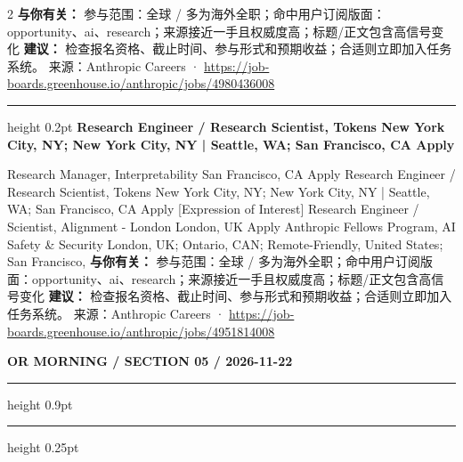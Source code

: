 \documentclass[10.5pt]{ctexart}
\begin{document}
\begin{multicols}{2}
\textbf{与你有关：} 参与范围：全球 / 多为海外全职；命中用户订阅版面：opportunity、ai、research；来源接近一手且权威度高；标题/正文包含高信号变化
\textbf{建议：} 检查报名资格、截止时间、参与形式和预期收益；合适则立即加入任务系统。
{\footnotesize\color{ormuted} 来源：Anthropic Careers · \url{https://job-boards.greenhouse.io/anthropic/jobs/4980436008}}
\vspace{2mm}
\hrule height 0.2pt
\vspace{2mm}
{\large\bfseries Research Engineer / Research Scientist, Tokens New York City, NY; New York City, NY | Seattle, WA; San Francisco, CA Apply}\par
[Expression of Interest] Research Manager, Interpretability San Francisco, CA Apply Research Engineer / Research Scientist, Tokens New York City, NY; New York City, NY | Seattle, WA; San Francisco, CA Apply [Expression of Interest] Research Engineer / Scientist, Alignment - London London, UK Apply Anthropic Fellows Program, AI Safety \& Security London, UK; Ontario, CAN; Remote-Friendly, United States; San Francisco, 
\textbf{与你有关：} 参与范围：全球 / 多为海外全职；命中用户订阅版面：opportunity、ai、research；来源接近一手且权威度高；标题/正文包含高信号变化
\textbf{建议：} 检查报名资格、截止时间、参与形式和预期收益；合适则立即加入任务系统。
{\footnotesize\color{ormuted} 来源：Anthropic Careers · \url{https://job-boards.greenhouse.io/anthropic/jobs/4951814008}}
\end{multicols}
\newpage
{\small\bfseries OR MORNING / SECTION 05 / 2026-11-22}
\vspace{2mm}
\hrule height 0.9pt
\vspace{1.5mm}
\hrule height 0.25pt
\vspace{4mm}
\end{document}
